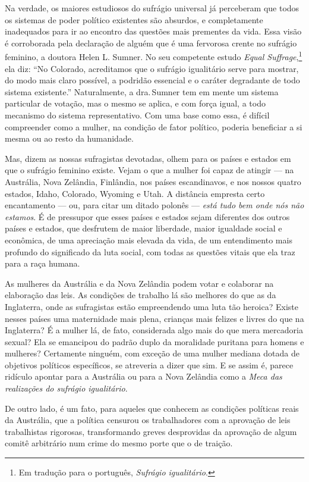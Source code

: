 Na verdade, os maiores estudiosos do sufrágio universal já perceberam
que todos os sistemas de poder político existentes são absurdos, e
completamente inadequados para ir ao encontro das questões mais
prementes da vida. Essa visão é corroborada pela declaração de alguém
que é uma fervorosa crente no sufrágio feminino, a doutora Helen L.
Sumner. No seu competente estudo \textit{Equal Suffrage},\footnote{Em tradução para o português, \textit{Sufrágio igualitário}.} ela diz: ``No Colorado, acreditamos que o
sufrágio igualitário serve para mostrar, do modo mais claro possível, a
podridão essencial e o caráter degradante de todo sistema existente.''
Naturalmente, a dra.\,Sumner tem em mente um sistema particular de
votação, mas o mesmo se aplica, e com força igual, a todo mecanismo do
sistema representativo. Com uma base como essa, é difícil compreender
como a mulher, na condição de fator político, poderia beneficiar a si
mesma ou ao resto da humanidade.

Mas, dizem as nossas sufragistas devotadas, olhem para os países e
estados em que o sufrágio feminino existe. Vejam o que a mulher foi
capaz de atingir --- na Austrália, Nova Zelândia, Finlândia, nos países
escandinavos, e nos nossos quatro estados, Idaho, Colorado, Wyoming e
Utah. A distância empresta certo encantamento --- ou, para citar um
ditado polonês --- \textit{está tudo bem onde nós não estamos}. É de
pressupor que esses países e estados sejam diferentes dos outros países e estados, que desfrutem de maior liberdade, maior igualdade social e
econômica, de uma apreciação mais elevada da vida, de um entendimento
mais profundo do significado da luta social, com todas as questões
vitais que ela traz para a raça humana.

As mulheres da Austrália e da Nova Zelândia podem votar e colaborar na
elaboração das leis. As condições de trabalho lá são melhores do que as
da Inglaterra, onde as sufragistas estão empreendendo uma luta tão
heroica? Existe nesses países uma maternidade mais plena, crianças mais
felizes e livres do que na Inglaterra? É a mulher lá, de fato,
considerada algo mais do que mera mercadoria sexual? Ela se emancipou do
padrão duplo da moralidade puritana para homens e mulheres? Certamente
ninguém, com exceção de uma mulher mediana dotada de objetivos políticos
específicos, se atreveria a dizer que sim. E se assim é, parece ridículo
apontar para a Austrália ou para a Nova Zelândia como a \textit{Meca das
realizações do sufrágio igualitário}.

De outro lado, é um fato, para aqueles que conhecem as condições
políticas reais da Austrália, que a política censurou os trabalhadores
com a aprovação de leis trabalhistas rigorosas, transformando greves
desprovidas da aprovação de algum comitê arbitrário num crime do mesmo
porte que o de traição.

